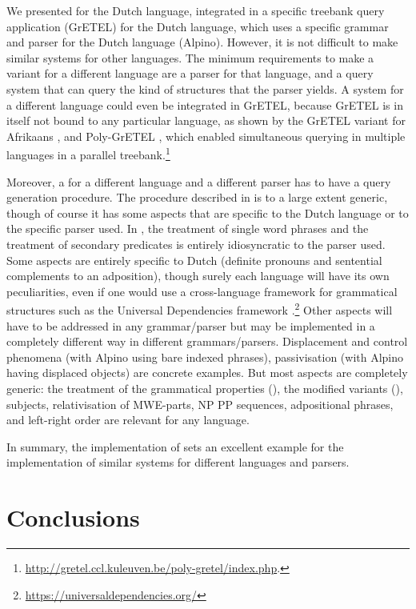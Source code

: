\documentclass[output=paper,colorlinks,citecolor=brown]{langscibook}
\begin{document}
We presented {\mwefinder} for the Dutch language, integrated in a specific treebank query application (GrETEL) for the Dutch language, which uses a specific grammar and parser for the Dutch language (Alpino).
However, it is not difficult to make similar systems for other languages. The minimum requirements to make a variant for a different language are a parser for that language, and a query system that can query the kind of structures that the parser yields.
A system for a different language could even be integrated in GrETEL, because GrETEL is in itself not bound to any particular language, as shown by the GrETEL variant for Afrikaans \citep{AUGUSTINUS16.362}, and Poly-GrETEL \citep{AUGUSTINUS16.486}, which enabled simultaneous querying in multiple languages in a parallel treebank.\footnote{\url{http://gretel.ccl.kuleuven.be/poly-gretel/index.php}.}

Moreover, a {\mwefinder} for a different language and a different parser  has to have a query generation
procedure. The procedure described in  is to a large extent generic, though of course it has some aspects that are specific to the Dutch language or to the specific parser used.
In {\mwefinder}, the treatment of single word phrases and the treatment of secondary predicates is entirely idiosyncratic to the parser used. 
Some aspects are entirely specific to Dutch (definite pronouns and sentential complements  to an adposition), though surely each language will have its own peculiarities, even if one would use a cross-language framework for grammatical structures such as the Universal Dependencies framework \citep{NIVRE16.348}.\footnote{\url{https://universaldependencies.org/}}
Other aspects will have to be addressed in any grammar/parser but may be implemented in a  completely different way in different grammars/parsers. Displacement and control phenomena (with Alpino using bare indexed phrases), passivisation (with Alpino having displaced objects) are concrete examples.
But most  aspects are completely generic: the treatment of the grammatical properties (), the 
modified variants (), subjects, relativisation of MWE-parts, NP PP sequences, adpositional phrases, and left-right order are relevant for any language.

In summary, the implementation of {\mwefinder} sets an excellent example for the implementation of similar systems for different languages and parsers. 

\section{Conclusions}
\label{conclusions}
\end{document}
